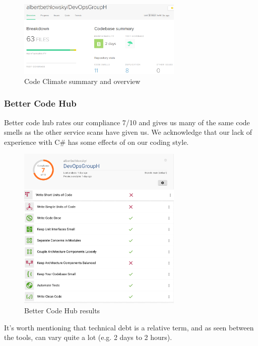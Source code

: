 \documentclass{article}
\begin{document}
\begin{figure}[H]
\centering
\includegraphics[width=0.7\textwidth]{images/codeclimate.png}
\caption{\label{fig:dep1} Code Climate summary and overview}
\end{figure}

\subsubsection*{Better Code Hub}
Better code hub rates our compliance 7/10 and gives us many of the same code smells as the other service scans have given us. We acknowledge that our lack of experience with C\# has some effects of on our coding style. 

\begin{figure}[H]
\centering
\includegraphics[width=0.7\textwidth]{images/bch.png}
\caption{\label{fig:dep1} Better Code Hub results}
\end{figure}

It's worth mentioning that technical debt is a relative term, and as seen between the tools, can vary quite a lot (e.g. 2 days to 2 hours).
\end{document}
